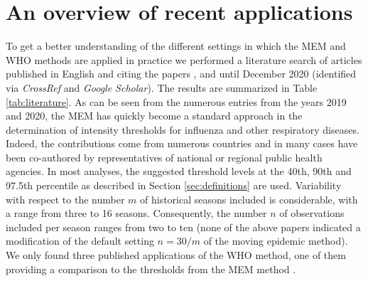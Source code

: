 \documentclass{article}
\begin{document}

\section{An overview of recent applications}
\label{sec:recent_applications}

To get a better understanding of the different settings in which the MEM and WHO methods are applied in practice we performed a literature search of articles published in English and citing the papers \cite{Vega2015}, \cite{WHO2014} and \cite{WHO2017} until December 2020 (identified via \textit{CrossRef} and \textit{Google Scholar}). The results are summarized in Table \ref{tab:literature}. As can be seen from the numerous entries from the years 2019 and 2020, the MEM has quickly become a standard approach in the determination of intensity thresholds for influenza and other respiratory diseases. Indeed, the contributions come from numerous countries and in many cases have been co-authored by representatives of national or regional public health agencies. In most analyses, the suggested threshold levels at the 40th, 90th and 97.5th percentile as described in Section \ref{sec:definitions} are used. Variability with respect to the number $m$ of historical seasons included is considerable, with a range from three to 16 seasons. Consequently, the number $n$ of observations included per season ranges from two to ten (none of the above papers indicated a modification of the default setting $n = 30/m$ of the moving epidemic method). We only found three published applications of the WHO method, one of them providing a comparison to the thresholds from the MEM method \citep{Rguig2020}.
\end{document}
